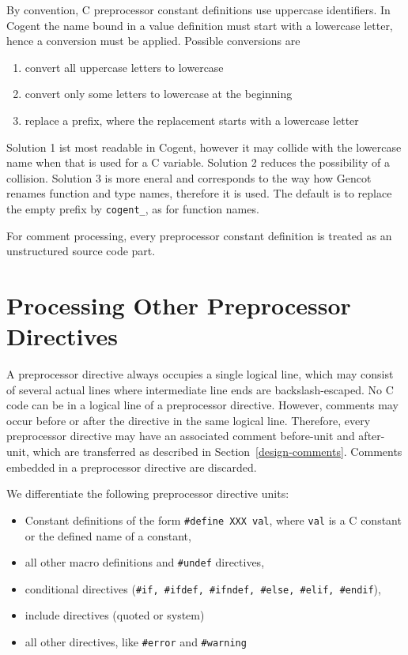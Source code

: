 \documentclass[a4paper]{report}
\newcommand{\code}[1]{\textnormal{\texttt{#1}}}
\begin{document}
By convention, C preprocessor constant definitions use uppercase identifiers. In Cogent the name bound in a value definition
must start with a lowercase letter, hence a conversion must be applied. Possible conversions are
\begin{enumerate}
\item convert all uppercase letters to lowercase
\item convert only some letters to lowercase at the beginning
\item replace a prefix, where the replacement starts with a lowercase letter
\end{enumerate}

Solution 1 ist most readable in Cogent, however it may collide with the lowercase name when that is used for a C variable. 
Solution 2 reduces the possibility of a collision. Solution 3 is more eneral and corresponds to the way how Gencot renames
function and type names, therefore it is used. The default is to replace the empty prefix by \code{cogent\_}, as for
function names.

For comment processing, every preprocessor constant definition is treated as an unstructured source code part.

\section{Processing Other Preprocessor Directives}
\label{design-preprocessor}

A preprocessor directive always occupies a single logical line, which may consist of several actual lines where 
intermediate line ends are backslash-escaped. No C code can be in a logical line of a preprocessor directive.
However, comments may occur before or after the directive in the same logical line. Therefore, every preprocessor 
directive may have an associated comment before-unit and after-unit, which are transferred as described in 
Section~\ref{design-comments}. Comments embedded in a preprocessor directive are discarded.

We differentiate the following preprocessor directive units:
\begin{itemize}
\item Constant definitions of the form \code{\#define XXX val}, where \code{val} is a C constant or the defined 
name of a constant,
\item all other macro definitions and \code{\#undef} directives,
\item conditional directives (\code{\#if, \#ifdef, \#ifndef, \#else, \#elif, \#endif}),
\item include directives (quoted or system)
\item all other directives, like \code{\#error} and \code{\#warning}
\end{itemize}
\end{document}
